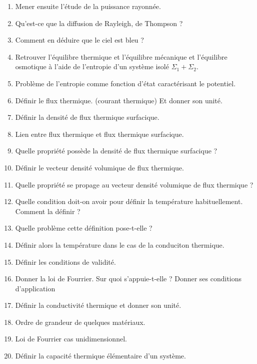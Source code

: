 \documentclass[a4paper, 11pt, hidelinks]{article}
\begin{document}
\begin{enumerate}
    \item Mener ensuite l'étude de la puissance rayonnée. \cite{Chapitre18}
    \item Qu'est-ce que la diffusion de Rayleigh, de Thompson ? \cite{Chapitre18}
    \item Comment en déduire que le ciel est bleu ? \cite{Chapitre18}
    \item Retrouver l'équilibre thermique et l'équilibre mécanique et l'équilibre osmotique à l'aide de l'entropie d'un système isolé $\Sigma_1 + \Sigma_2$. \cite{Chapitre1bis}
    \item Problème de l'entropie comme fonction d'état caractérisant le potentiel. \cite{Chapitre1bis}
    \item Définir le flux thermique. (courant thermique) Et donner son unité. \cite{Chapitre20}
    \item Définir la densité de flux thermique surfacique. \cite{Chapitre20}
    \item Lien entre flux thermique et flux thermique surfacique. \cite{Chapitre20}
    \item Quelle propriété possède la densité de flux thermique surfacique ? \cite{Chapitre20}
    \item Définir le vecteur densité volumique de flux thermique. \cite{Chapitre20}
    \item Quelle propriété se propage au vecteur densité volumique de flux thermique ? \cite{Chapitre20}
    \item Quelle condition doit-on avoir pour définir la température habituellement. Comment la définir ? \cite{Chapitre20}
    \item Quelle problème cette définition pose-t-elle ? \cite{Chapitre20}
    \item Définir alors la température dans le cas de la conduciton thermique. \cite{Chapitre20}
    \item Définir les conditions de validité. \cite{Chapitre20}
    \item Donner la loi de Fourrier. Sur quoi s'appuie-t-elle ? Donner ses conditions d'application \cite{Chapitre20}
    \item Définir la conductivité thermique et donner son unité. \cite{Chapitre20}
    \item Ordre de grandeur de quelques matériaux. \cite{Chapitre20}
    \item Loi de Fourrier cas unidimensionnel. \cite{Chapitre20}
    \item Définir la capacité thermique élémentaire d'un système. \cite{Chapitre20}

\end{enumerate}
\end{document}
